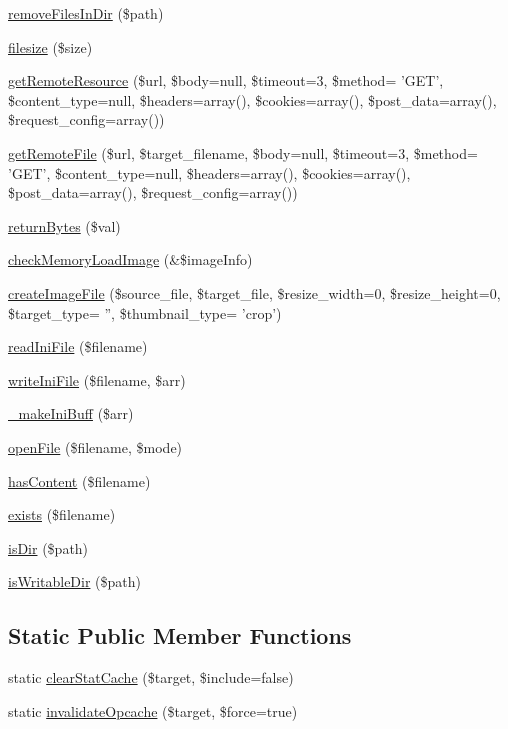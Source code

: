 \begin{DoxyCompactItemize}
\hyperlink{classFileHandler_a07839b4971e9ef40039d23ea65977d69}{remove\-Files\-In\-Dir} (\$path)
\item 
\hyperlink{classFileHandler_ae235b4ded589fb13caed260fabc0a30c}{filesize} (\$size)
\item 
\hyperlink{classFileHandler_a602c039b415c15d9d6866e586282faf7}{get\-Remote\-Resource} (\$url, \$body=null, \$timeout=3, \$method= 'G\-E\-T', \$content\-\_\-type=null, \$headers=array(), \$cookies=array(), \$post\-\_\-data=array(), \$request\-\_\-config=array())
\item 
\hyperlink{classFileHandler_a0e3720cacd0137d537834376ce7b982b}{get\-Remote\-File} (\$url, \$target\-\_\-filename, \$body=null, \$timeout=3, \$method= 'G\-E\-T', \$content\-\_\-type=null, \$headers=array(), \$cookies=array(), \$post\-\_\-data=array(), \$request\-\_\-config=array())
\item 
\hyperlink{classFileHandler_a79dd068137470965b560f4d23d978e7d}{return\-Bytes} (\$val)
\item 
\hyperlink{classFileHandler_a0b240e89b6ce57cb94e855fc25e5e9f3}{check\-Memory\-Load\-Image} (\&\$image\-Info)
\item 
\hyperlink{classFileHandler_a171948d79c14415ad45b7581a011c593}{create\-Image\-File} (\$source\-\_\-file, \$target\-\_\-file, \$resize\-\_\-width=0, \$resize\-\_\-height=0, \$target\-\_\-type= '', \$thumbnail\-\_\-type= 'crop')
\item 
\hyperlink{classFileHandler_a58a8bbae1ab4acb358599db38a47db4d}{read\-Ini\-File} (\$filename)
\item 
\hyperlink{classFileHandler_aa0fd9ce8f2c81bee472a403e75b578bd}{write\-Ini\-File} (\$filename, \$arr)
\item 
\hyperlink{classFileHandler_a8975f9247987757497e0288f3ee09173}{\-\_\-make\-Ini\-Buff} (\$arr)
\item 
\hyperlink{classFileHandler_a690753d8cf8ff837f28a811cdfbfa069}{open\-File} (\$filename, \$mode)
\item 
\hyperlink{classFileHandler_ad872016e83b1f62a03d54e359ce31f73}{has\-Content} (\$filename)
\item 
\hyperlink{classFileHandler_a862c4f6349792ae8f094ec456c9a26ed}{exists} (\$filename)
\item 
\hyperlink{classFileHandler_a5fd371542d6f1a86269d0b8795e74471}{is\-Dir} (\$path)
\item 
\hyperlink{classFileHandler_a9494e34a28f27b6a1ab2e032aada2bbb}{is\-Writable\-Dir} (\$path)
\end{DoxyCompactItemize}
\subsection*{Static Public Member Functions}
\begin{DoxyCompactItemize}
\item 
static \hyperlink{classFileHandler_a7e4462e976955e4dad6093e5ee89f6e3}{clear\-Stat\-Cache} (\$target, \$include=false)
\item 
static \hyperlink{classFileHandler_afd6bbc5690c4bd11c11e6e0ad26c6d48}{invalidate\-Opcache} (\$target, \$force=true)
\end{DoxyCompactItemize}


